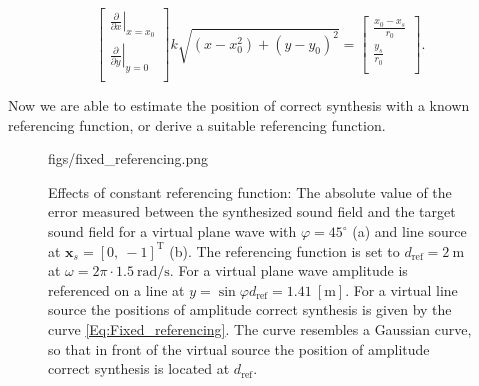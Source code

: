 \documentclass[12pt,a4paper]{article}
\newcommand{\sinfi}{\sin\varphi}
\newcommand{\dref}{d_{\mathrm{ref}}}
\begin{document}
\begin{itemize}
\begin{equation}
\begin{bmatrix} 
\left. \frac{\partial}{\partial x} \right|_{x = x_0} 
\\[0.3em] 
\left. \frac{\partial}{\partial y} \right|_{y = 0} 
\\[0.3em]    \end{bmatrix} 
k\sqrt{(x-x_0^2) + (y-y_0)^2} = 
\begin{bmatrix} 
\frac{x_0- x_s}{r_0}
\\[0.3em] 
\frac{y_s}{r_0}
\\[0.3em]    \end{bmatrix} 
.
\end{equation}
\end{itemize}

Now we are able to estimate the position of correct synthesis with a known referencing function, or derive a suitable referencing function.

\begin{figure}
	\centering
	\begin{overpic}[width = 1\columnwidth ]{figs/fixed_referencing.png}
	\scriptsize
	\end{overpic}
\caption{ Effects of constant referencing function: The absolute value of the error measured between the synthesized sound field and the target sound field for a virtual plane wave with $\varphi = 45^{\circ}$ (a) and line source at $\mathbf{x}_s = [0,\ -1]^{\mathrm{T}}$ (b). The referencing function is set to $\dref = 2~\mathrm{m}$ at $\omega = 2\pi\cdot 1.5~\mathrm{rad/s}$. For a virtual plane wave amplitude is referenced on a line at $y = \sinfi \dref = 1.41~[\mathrm{m}]$. For a virtual line source the positions of amplitude correct synthesis is given by the curve \eqref{Eq:Fixed_referencing}. The curve resembles a Gaussian curve, so that in front of the virtual source the position of amplitude correct synthesis is located at $\dref$. }
	\label{Fig:Theory:fixed_referencing}
\end{figure}
\end{document}
